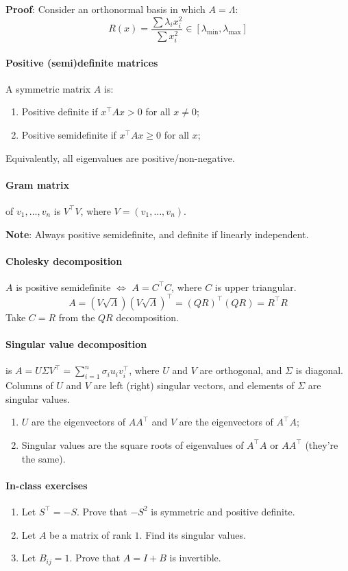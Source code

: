\documentclass{article}
\begin{document}
\textbf{Proof}: Consider an orthonormal basis in which $A = \Lambda$:
$$
R(x) = \frac{\sum \lambda_i x_i^2}{\sum x_i^2} \in [\lambda_{\min}, \lambda_{\max}]
$$
\paragraph{Positive (semi)definite matrices} A symmetric matrix $A$ is:
\begin{enumerate}
    \item Positive definite if $x^\top Ax > 0$ for all $x \neq 0$;
    \item Positive semidefinite if $x^\top Ax \geq 0$ for all $x$;
\end{enumerate}

Equivalently, all eigenvalues are positive/non-negative.

\paragraph{Gram matrix} of $v_1,\dots,v_n$ is $V^\top V$, where $V = (v_1,\dots,v_n)$.

\textbf{Note}: Always positive semidefinite, and definite if linearly independent.

\paragraph{Cholesky decomposition} $A$ is positive semidefinite $\iff$ $A = C^\top C$, where $C$ is upper triangular.
$$
A=(V\sqrt\Lambda)(V\sqrt\Lambda)^\top = (QR)^\top (QR) = R^\top R
$$
Take $C = R$ from the $QR$ decomposition.

\paragraph{Singular value decomposition} is $A = U \Sigma V^\top = \sum\limits_{i=1}^n \sigma_i u_i v_i^\top$, where $U$ and $V$ are orthogonal, and $\Sigma$ is diagonal. Columns of $U$ and $V$ are left (right) singular vectors, and elements of $\Sigma$ are singular values.

\begin{enumerate}
    \item $U$ are the eigenvectors of $A A^\top$ and $V$ are the eigenvectors of $A^\top A$;
    \item Singular values are the square roots of eigenvalues of $A^\top A$ or $A A^\top$ (they're the same).
\end{enumerate}



\paragraph{In-class exercises}

\begin{enumerate}
    \item Let $S^\top = -S$. Prove that $-S^2$ is symmetric and positive definite.
    \item Let $A$ be a matrix of rank $1$. Find its singular values.
    \item Let $B_{ij}=1$. Prove that $A = I+B$ is invertible.
\end{enumerate}
\end{document}
